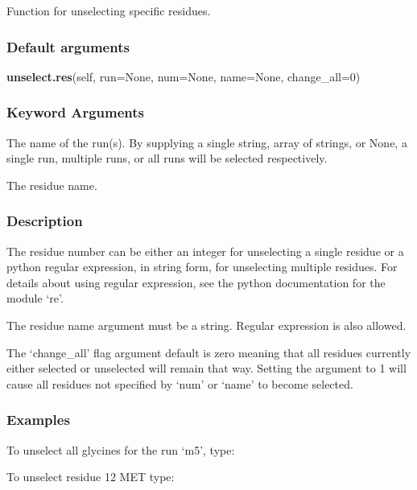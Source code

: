 Function for unselecting specific residues.

\subsubsection{Default arguments}

\textsf{\textbf{unselect.res}(self, run=None, num=None, name=None, change\_all=0)}


\subsubsection{Keyword Arguments}

  The name of the run(s).  By supplying a single string, array of strings, or None, a single run, multiple runs, or all runs will be selected respectively.

  The residue name.


\subsubsection{Description}

The residue number can be either an integer for unselecting a single residue or a python
regular expression, in string form, for unselecting multiple residues.  For details about
using regular expression, see the python documentation for the module `re'.

The residue name argument must be a string.  Regular expression is also allowed.

The `change\_all' flag argument default is zero meaning that all residues currently either
selected or unselected will remain that way.  Setting the argument to 1 will cause all
residues not specified by `num' or `name' to become selected.


\subsubsection{Examples}

To unselect all glycines for the run `m5', type:


To unselect residue 12 MET type:





\newpage

